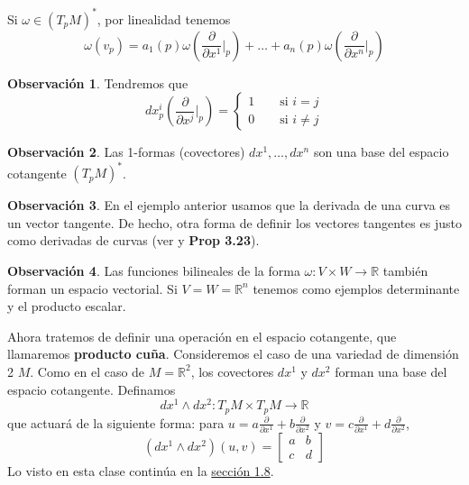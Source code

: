 \documentclass[spanish]{book}
\theoremstyle{definition}
\newtheorem*{obs}{Observación}
\newcommand{\R}{\mathbb{R}}
\begin{document}
Si $\omega\in(T_pM)^*$, por linealidad tenemos
\[\omega(v_p)=a_1(p)\omega\left(\frac{\partial}{\partial x^1}\Big|_p\right)+\ldots+a_n(p)\omega\left(\frac{\partial}{\partial x^n}\Big|_p\right)\]
\begin{obs}
	Tendremos que
	\[dx_p^i\left(\frac{\partial}{\partial x^j}\Big|_p\right)=\begin{cases}
		1\qquad\text{si }i=j\\
		0\qquad\text{si }i\neq j
	\end{cases}\]
\end{obs}
\begin{obs}
	Las 1-formas (covectores) $dx^1,\ldots,dx^n$ son una base del espacio cotangente $(T_pM)^*$.
\end{obs}
\begin{obs}
	En el ejemplo anterior usamos que la derivada de una curva es un vector tangente. De hecho, otra forma de definir los vectores tangentes es justo como derivadas de curvas (ver \cite{DoCarmo} y \cite{Lee} \textbf{Prop 3.23}).
\end{obs}

\begin{obs}
	Las funciones bilineales de la forma $\omega:V\times W\to\R$ también forman un espacio vectorial. Si $V=W=\R^n$ tenemos como ejemplos determinante y el producto escalar.
\end{obs}

Ahora tratemos de definir una operación en el espacio cotangente, que llamaremos \textbf{producto cuña}. Consideremos el caso de una variedad de dimensión 2 $M$. Como en el caso de $M=\R^2$, los covectores $dx^1$ y $dx^2$ forman una base del espacio cotangente. Definamos
\[dx^1\wedge dx^2:T_pM\times T_pM\to\R\]
que actuará de la siguiente forma: para $u=a\frac{\partial}{\partial x^1}+b\frac{\partial}{\partial x^2}$ y $v=c\frac{\partial}{\partial x^1}+d\frac{\partial}{\partial x^2}$,
\[(dx^1\wedge dx^2)(u,v)=\begin{bmatrix}
	a&b\\
	c&d
\end{bmatrix}\]
Lo visto en esta clase continúa en la \hyperref[sec:formas-dif]{sección 1.8}.
\end{document}
